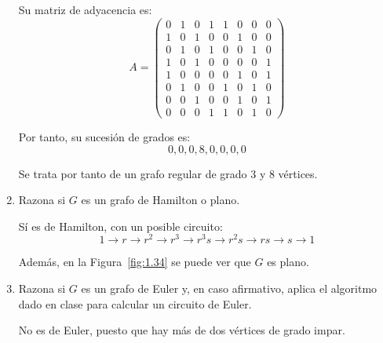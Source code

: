 \begin{ejercicio}
\begin{enumerate}
        Su matriz de adyacencia es:
        \[
            A=\begin{pmatrix}
                0 & 1 & 0 & 1 & 1 & 0 & 0 & 0 \\
                1 & 0 & 1 & 0 & 0 & 1 & 0 & 0 \\
                0 & 1 & 0 & 1 & 0 & 0 & 1 & 0 \\
                1 & 0 & 1 & 0 & 0 & 0 & 0 & 1 \\
                1 & 0 & 0 & 0 & 0 & 1 & 0 & 1 \\
                0 & 1 & 0 & 0 & 1 & 0 & 1 & 0 \\
                0 & 0 & 1 & 0 & 0 & 1 & 0 & 1 \\
                0 & 0 & 0 & 1 & 1 & 0 & 1 & 0
            \end{pmatrix}
        \]

        Por tanto, su sucesión de grados es:
        \begin{equation*}
            0, 0, 0, 8, 0, 0, 0, 0
        \end{equation*}

        Se trata por tanto de un grafo regular de grado $3$ y $8$ vértices.
        \item Razona si $G$ es un grafo de Hamilton o plano.
        
        Sí es de Hamilton, con un posible circuito:
        \begin{equation*}
            1\to r\to r^2\to r^3\to r^3s\to r^2s\to rs\to s\to 1
        \end{equation*}

        Además, en la Figura~\ref{fig:1.34} se puede ver que $G$ es plano.
        \item Razona si $G$ es un grafo de Euler y, en caso afirmativo, aplica el algoritmo dado en clase para calcular un circuito de Euler.
        
        No es de Euler, puesto que hay más de dos vértices de grado impar.
    \end{enumerate}
\end{ejercicio}


